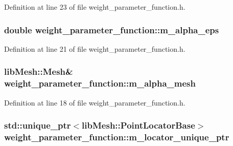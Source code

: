 Definition at line 23 of file weight\+\_\+parameter\+\_\+function.\+h.

\hypertarget{classweight__parameter__function_a6ad313072643dbac787120791eeeac26}{}
\subsubsection[{m\+\_\+alpha\+\_\+eps}]{\setlength{\rightskip}{0pt plus 5cm}double weight\+\_\+parameter\+\_\+function\+::m\+\_\+alpha\+\_\+eps\hspace{0.3cm}{\ttfamily [protected]}}\label{classweight__parameter__function_a6ad313072643dbac787120791eeeac26}


Definition at line 21 of file weight\+\_\+parameter\+\_\+function.\+h.

\hypertarget{classweight__parameter__function_a391a5a229d29fd746e352af0ec804495}{}
\subsubsection[{m\+\_\+alpha\+\_\+mesh}]{\setlength{\rightskip}{0pt plus 5cm}lib\+Mesh\+::\+Mesh\& weight\+\_\+parameter\+\_\+function\+::m\+\_\+alpha\+\_\+mesh\hspace{0.3cm}{\ttfamily [protected]}}\label{classweight__parameter__function_a391a5a229d29fd746e352af0ec804495}


Definition at line 18 of file weight\+\_\+parameter\+\_\+function.\+h.

\hypertarget{classweight__parameter__function_ae37938d69363743baba5797c599e0640}{}
\subsubsection[{m\+\_\+locator\+\_\+unique\+\_\+ptr}]{\setlength{\rightskip}{0pt plus 5cm}std\+::unique\+\_\+ptr$<$lib\+Mesh\+::\+Point\+Locator\+Base$>$ weight\+\_\+parameter\+\_\+function\+::m\+\_\+locator\+\_\+unique\+\_\+ptr\hspace{0.3cm}{\ttfamily [protected]}}\label{classweight__parameter__function_ae37938d69363743baba5797c599e0640}


